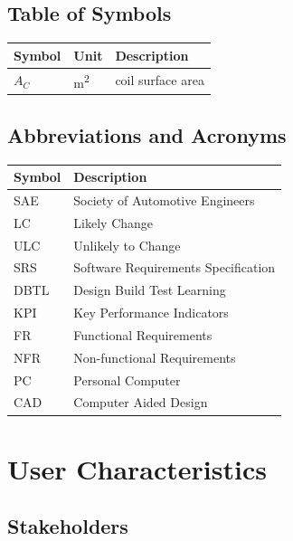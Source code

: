 \documentclass[12pt]{article}
\begin{document}
\subsection{Table of Symbols}

\renewcommand{\arraystretch}{1.2}
\noindent \begin{longtable*}{l l p{12cm}} \toprule
\textbf{Symbol} & \textbf{Unit} & \textbf{Description}\\
\midrule 
$A_C$ & \si[per-mode=symbol] {\square\metre} & coil surface area\\
\bottomrule
\end{longtable*}


\subsection{Abbreviations and Acronyms}

\renewcommand{\arraystretch}{1.2}
\noindent \begin{longtable*}{l p{13cm}} 
  \toprule		
  \textbf{Symbol} & \textbf{Description}\\
  \midrule 
  SAE & Society of Automotive Engineers\\
  LC & Likely Change\\
  ULC & Unlikely to Change\\
  SRS & Software Requirements Specification\\
  DBTL & Design Build Test Learning\\
  KPI & Key Performance Indicators\\
  FR & Functional Requirements\\
  NFR & Non-functional Requirements\\
  PC & Personal Computer\\
  CAD & Computer Aided Design\\

  
  \bottomrule
\end{longtable*}


\section{User Characteristics}


\subsection{Stakeholders}
\end{document}
